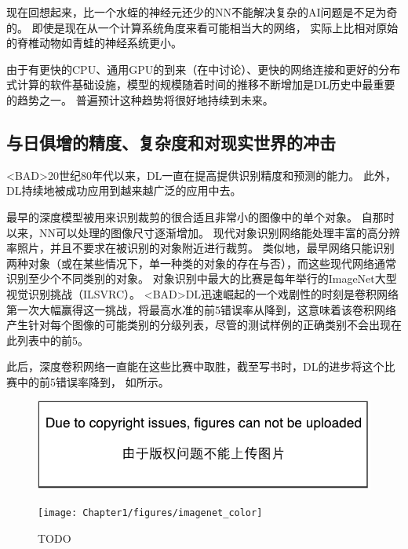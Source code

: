 现在回想起来，比一个水蛭的神经元还少的\gls{NN}不能解决复杂的\gls{AI}问题是不足为奇的。
即使是现在从一个计算系统角度来看可能相当大的网络， 实际上比相对原始的脊椎动物如青蛙的神经系统更小。

由于有更快的CPU、通用GPU的到来（在中讨论）、更快的网络连接和更好的分布式计算的软件基础设施，模型的规模随着时间的推移不断增加是\gls{DL}历史中最重要的趋势之一。
普遍预计这种趋势将很好地持续到未来。


\subsection{与日俱增的精度、复杂度和对现实世界的冲击}
\label{sec:increasing_accuracy_complexity_and_real_world_impact}

<BAD>20世纪80年代以来，\gls{DL}一直在提高提供识别精度和预测的能力。
此外，\gls{DL}持续地被成功应用到越来越广泛的应用中去。

最早的深度模型被用来识别裁剪的很合适且非常小的图像中的单个对象\citep{Rumelhart86}。
自那时以来，\gls{NN}可以处理的图像尺寸逐渐增加。
现代对象识别网络能处理丰富的高分辨率照片，并且不要求在被识别的对象附近进行裁剪\citep{Krizhevsky-2012}。
类似地，最早网络只能识别两种对象（或在某些情况下，单一种类的对象的存在与否），而这些现代网络通常识别至少个不同类别的对象。
对象识别中最大的比赛是每年举行的ImageNet大型视觉识别挑战（ILSVRC）。
<BAD>\gls{DL}迅速崛起的一个戏剧性的时刻是卷积网络第一次大幅赢得这一挑战，将最高水准的前5错误率从降到\citep{Krizhevsky-2012}，这意味着该卷积网络产生针对每个图像的可能类别的分级列表，尽管的测试样例的正确类别不会出现在此列表中的前5。

此后，深度卷积网络一直能在这些比赛中取胜，截至写书时，\gls{DL}的进步将这个比赛中的前5错误率降到， 如所示。
\begin{figure}[!htb]
\ifOpenSource
\centerline{\includegraphics{figure.pdf}}
\else
\centerline{\texttt{[image: Chapter1/figures/imagenet\_color]}}
\fi
\caption{TODO}
\label{fig:chap1_imagenet_color}
\end{figure}

